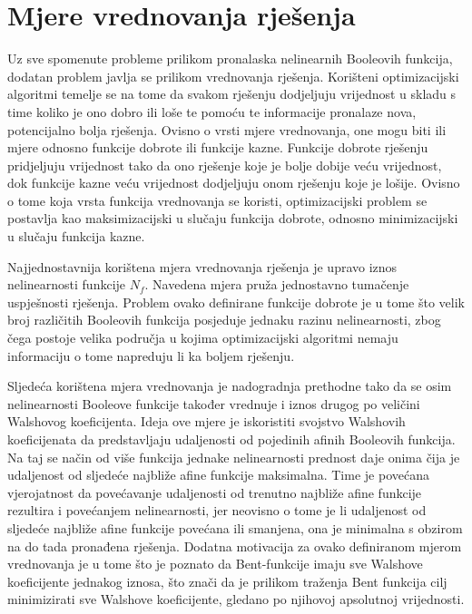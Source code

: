 \section{Mjere vrednovanja rješenja}
Uz sve spomenute probleme prilikom pronalaska nelinearnih Booleovih funkcija, dodatan problem javlja se prilikom vrednovanja rješenja.
Korišteni optimizacijski algoritmi temelje se na tome da svakom rješenju dodjeljuju vrijednost u skladu s time koliko je ono dobro ili loše te pomoću te informacije pronalaze nova, potencijalno bolja rješenja.
Ovisno o vrsti mjere vrednovanja, one mogu biti ili mjere odnosno funkcije dobrote ili funkcije kazne.
Funkcije dobrote rješenju pridjeljuju vrijednost tako da ono rješenje koje je bolje dobije veću vrijednost, dok funkcije kazne veću vrijednost dodjeljuju onom rješenju koje je lošije.
Ovisno o tome koja vrsta funkcija vrednovanja se koristi, optimizacijski problem se postavlja kao maksimizacijski u slučaju funkcija dobrote, odnosno minimizacijski u slučaju funkcija kazne.

Najjednostavnija korištena mjera vrednovanja rješenja je upravo iznos nelinearnosti funkcije $N_f$.
Navedena mjera pruža jednostavno tumačenje uspješnosti rješenja.
Problem ovako definirane funkcije dobrote je u tome što velik broj različitih Booleovih funkcija posjeduje jednaku razinu nelinearnosti, zbog čega postoje velika područja u kojima optimizacijski algoritmi nemaju informaciju o tome napreduju li ka boljem rješenju.

Sljedeća korištena mjera vrednovanja je nadogradnja prethodne tako da se osim nelinearnosti 
Booleove funkcije također vrednuje i iznos drugog po veličini Walshovog koeficijenta.
Ideja ove mjere je iskoristiti svojstvo Walshovih koeficijenata da predstavljaju udaljenosti od pojedinih afinih Booleovih funkcija.
Na taj se način od više funkcija jednake nelinearnosti prednost daje onima čija je udaljenost od sljedeće najbliže afine funkcije maksimalna.
Time je povećana vjerojatnost da povećavanje udaljenosti od trenutno najbliže afine funkcije rezultira i povećanjem nelinearnosti, jer neovisno o tome je li udaljenost od sljedeće najbliže afine funkcije povećana ili smanjena, ona je minimalna s obzirom na do tada pronađena rješenja.
Dodatna motivacija za ovako definiranom mjerom vrednovanja je u tome što je poznato da Bent-funkcije imaju sve Walshove koeficijente jednakog iznosa, što znači da je prilikom traženja Bent funkcija cilj minimizirati sve Walshove koeficijente, gledano po njihovoj apsolutnoj vrijednosti.

